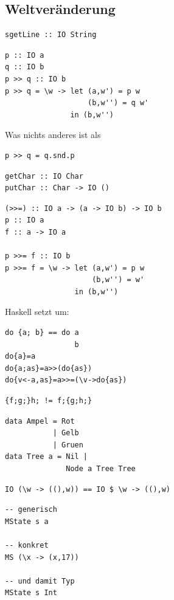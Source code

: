 	\subsection{Weltveränderung} %
	\label{sub:weltveraenderung}
		\lstHaskell
		\begin{lstlisting}[morekeywords={sgetLine}]
sgetLine :: IO String
		\end{lstlisting}
		\lstHaskell
		\begin{lstlisting}
p :: IO a
q :: IO b
p >> q :: IO b
p >> q = \w -> let (a,w') = p w
                   (b,w'') = q w'
               in (b,w'')
		\end{lstlisting}
		Was nichts anderes ist als
		\lstHaskell
		\begin{lstlisting}
p >> q = q.snd.p
		\end{lstlisting}
		\lstHaskell
		\begin{lstlisting}
getChar :: IO Char
putChar :: Char -> IO ()
		\end{lstlisting}
		\lstHaskell
		\begin{lstlisting}
(>>=) :: IO a -> (a -> IO b) -> IO b
p :: IO a
f :: a -> IO a

p >>= f :: IO b
p >>= f = \w -> let (a,w') = p w
                    (b,w'') = w'
                in (b,w'')
		\end{lstlisting}
				Haskell setzt um:
		\lstHaskell
		\begin{lstlisting}
do {a; b} == do a
                b
do{a}=a
do{a;as}=a>>(do{as})
do{v<-a,as}=a>>=(\v->do{as})
		\end{lstlisting}

		\lstHaskell
		\begin{lstlisting}
{f;g;}h; != f;{g;h;}
		\end{lstlisting}
		\lstHaskell
		\begin{lstlisting}
data Ampel = Rot
           | Gelb
           | Gruen
data Tree a = Nil |
              Node a Tree Tree
		\end{lstlisting}
		\lstHaskell
		\begin{lstlisting}
IO (\w -> ((),w)) == IO $ \w -> ((),w)
		\end{lstlisting}


		\lstHaskell
		\begin{lstlisting}
-- generisch
MState s a

-- konkret
MS (\x -> (x,17))

-- und damit Typ
MState s Int
		\end{lstlisting}

